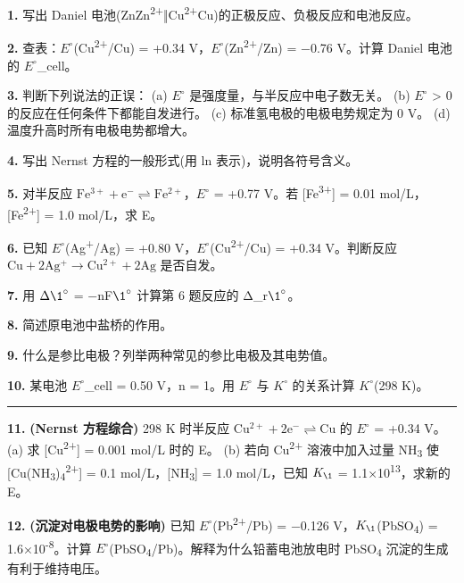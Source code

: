 \textbf{1.} 写出 Daniel 电池(Zn\textbar Zn\textsuperscript{2+}‖Cu\textsuperscript{2+}\textbar Cu)的正极反应、负极反应和电池反应。

\textbf{2.} 查表：\(E^{\circ}\)(Cu\textsuperscript{2+}/Cu) = +0.34 V，\(E^{\circ}\)(Zn\textsuperscript{2+}/Zn) = −0.76 V。计算 Daniel 电池的 \(E^{\circ}\)\_cell。

\textbf{3.} 判断下列说法的正误：
(a) \(E^{\circ}\) 是强度量，与半反应中电子数无关。
(b) \(E^{\circ}\) \textgreater{} 0 的反应在任何条件下都能自发进行。
(c) 标准氢电极的电极电势规定为 0 V。
(d) 温度升高时所有电极电势都增大。

\textbf{4.} 写出 Nernst 方程的一般形式(用 ln 表示)，说明各符号含义。

\textbf{5.} 对半反应 \(\mathrm{Fe^{3+} + e^- \rightleftharpoons Fe^{2+}}\)，\(E^{\circ}\) = +0.77 V。若 {[}Fe\textsuperscript{3+}{]} = 0.01 mol/L，{[}Fe\textsuperscript{2+}{]} = 1.0 mol/L，求 E。

\textbf{6.} 已知 \(E^{\circ}\)(Ag\textsuperscript{+}/Ag) = +0.80 V，\(E^{\circ}\)(Cu\textsuperscript{2+}/Cu) = +0.34 V。判断反应 \(\mathrm{Cu + 2Ag^+ \to Cu^{2+} + 2Ag}\) 是否自发。

\textbf{7.} 用 \(\Delta \1^{\circ}\) = −nF\(\1^{\circ}\) 计算第 6 题反应的 Δ\_r\(\1^{\circ}\)。

\textbf{8.} 简述原电池中盐桥的作用。

\textbf{9.} 什么是参比电极？列举两种常见的参比电极及其电势值。

\textbf{10.} 某电池 \(E^{\circ}\)\_cell = 0.50 V，n = 1。用 \(E^{\circ}\) 与 \(K^{\circ}\) 的关系计算 \(K^{\circ}\)(298 K)。

\begin{center}\rule{0.5\linewidth}{0.5pt}\end{center}

\textbf{11.} \textbf{(Nernst 方程综合)} 298 K 时半反应 \(\mathrm{Cu^{2+} + 2e^- \rightleftharpoons Cu}\) 的 \(E^{\circ}\) = +0.34 V。
(a) 求 {[}Cu\textsuperscript{2+}{]} = 0.001 mol/L 时的 E。
(b) 若向 Cu\textsuperscript{2+} 溶液中加入过量 NH\textsubscript{3} 使 {[}Cu(NH\textsubscript{3})\textsubscript{4}\textsuperscript{2+}{]} = 0.1 mol/L，{[}NH\textsubscript{3}{]} = 1.0 mol/L，已知 \(K_{\1}\) = 1.1×10\textsuperscript{13}，求新的 E。

\textbf{12.} \textbf{(沉淀对电极电势的影响)} 已知 \(E^{\circ}\)(Pb\textsuperscript{2+}/Pb) = −0.126 V，\(K_{\1}\)(PbSO\textsubscript{4}) = 1.6×10\textsuperscript{-8}。计算 \(E^{\circ}\)(PbSO\textsubscript{4}/Pb)。解释为什么铅蓄电池放电时 PbSO\textsubscript{4} 沉淀的生成有利于维持电压。

